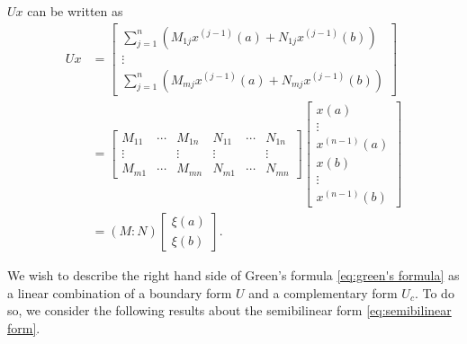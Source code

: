 \documentclass[10.5pt, oneside, a4paper]{article}
\begin{document}
\begin{rmk}
{    $Ux$ can be written as
    \begin{align*}
        Ux &= \begin{bmatrix}
            \sum_{j=1}^n (M_{1j}x^{(j-1)}(a) + N_{1j}x^{(j-1)}(b))\\
            \vdots\\
            \sum_{j=1}^n (M_{mj}x^{(j-1)}(a) + N_{mj}x^{(j-1)}(b))
        \end{bmatrix}\\
        &= \begin{bmatrix}
            M_{11} & \cdots & M_{1n} & N_{11} & \cdots & N_{1n}\\
            \vdots &  & \vdots & \vdots & & \vdots\\
            M_{m1} & \cdots & M_{mn} & N_{m1} & \cdots & N_{mn}
        \end{bmatrix} \begin{bmatrix}x(a)\\\vdots\\x^{(n-1)}(a)\\ x(b)\\\vdots\\x^{(n-1)}(b)\end{bmatrix}\\
        &= (M:N)\begin{bmatrix}
            \xi(a)\\
            \xi(b)
        \end{bmatrix}.
    \end{align*}
    }
\end{rmk}


We wish to describe the right hand side of Green's formula \eqref{eq:green's formula} as a linear combination of a boundary form $U$ and a complementary form $U_c$. To do so, we consider the following results about the semibilinear form \eqref{eq:semibilinear form}.
\end{document}
